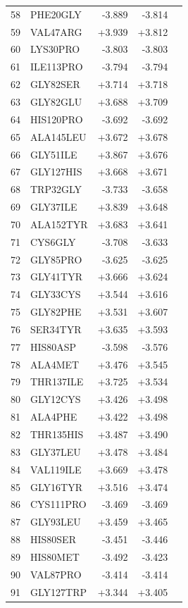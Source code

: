 \begin{longtable}{r l r r c}
58 & PHE20GLY & -3.889 & -3.814 &  \\
59 & VAL47ARG & +3.939 & +3.812 &  \\
60 & LYS30PRO & -3.803 & -3.803 &  \\
61 & ILE113PRO & -3.794 & -3.794 &  \\
62 & GLY82SER & +3.714 & +3.718 &  \\
63 & GLY82GLU & +3.688 & +3.709 &  \\
64 & HIS120PRO & -3.692 & -3.692 &  \\
65 & ALA145LEU & +3.672 & +3.678 &  \\
66 & GLY51ILE & +3.867 & +3.676 &  \\
67 & GLY127HIS & +3.668 & +3.671 &  \\
68 & TRP32GLY & -3.733 & -3.658 &  \\
69 & GLY37ILE & +3.839 & +3.648 &  \\
70 & ALA152TYR & +3.683 & +3.641 &  \\
71 & CYS6GLY & -3.708 & -3.633 &  \\
72 & GLY85PRO & -3.625 & -3.625 &  \\
73 & GLY41TYR & +3.666 & +3.624 &  \\
74 & GLY33CYS & +3.544 & +3.616 &  \\
75 & GLY82PHE & +3.531 & +3.607 &  \\
76 & SER34TYR & +3.635 & +3.593 &  \\
77 & HIS80ASP & -3.598 & -3.576 &  \\
78 & ALA4MET & +3.476 & +3.545 &  \\
79 & THR137ILE & +3.725 & +3.534 &  \\
80 & GLY12CYS & +3.426 & +3.498 &  \\
81 & ALA4PHE & +3.422 & +3.498 &  \\
82 & THR135HIS & +3.487 & +3.490 &  \\
83 & GLY37LEU & +3.478 & +3.484 &  \\
84 & VAL119ILE & +3.669 & +3.478 &  \\
85 & GLY16TYR & +3.516 & +3.474 &  \\
86 & CYS111PRO & -3.469 & -3.469 &  \\
87 & GLY93LEU & +3.459 & +3.465 &  \\
88 & HIS80SER & -3.451 & -3.446 &  \\
89 & HIS80MET & -3.492 & -3.423 &  \\
90 & VAL87PRO & -3.414 & -3.414 &  \\
91 & GLY127TRP & +3.344 & +3.405 &  \\

\end{longtable}
